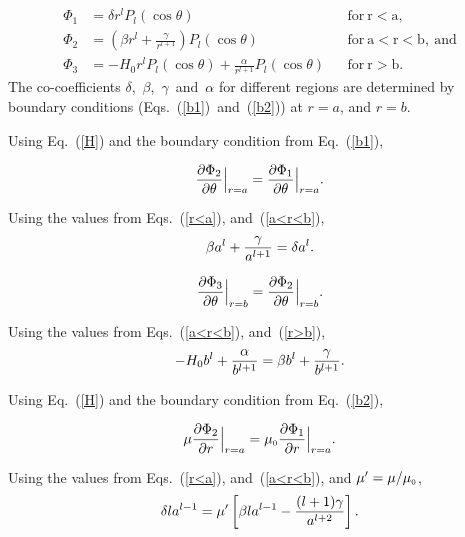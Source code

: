 \begin{align}
    \Phi_1 &= \delta r^l P_l(\cos\theta) && \mathrm{for~r<a,} \label{r<a} \\
    \Phi_2 &= \left(\beta r^l+\frac{\gamma}{r^{l+1}}\right)P_l(\cos\theta) && \mathrm{for~a<r<b,~and} \label{a<r<b} \\
    \Phi_3 &= -H_0 r^l P_l(\cos\theta)+\frac{\alpha}{r^{l+1}}P_l(\cos\theta) && \mathrm{for~r>b.} \label{r>b} 
\end{align}
The co-coefficients $\delta$,~$\beta$,~$\gamma$~and~$\alpha$ for different regions are determined by boundary conditions (Eqs.~(\ref{b1})~and~(\ref{b2})) at $r=a$, and $r=b$.

Using Eq.~(\ref{H}) and the boundary condition from Eq.~(\ref{b1}),


$$\frac{\partial \Phi_2}{\partial \theta}\Bigr|_{\substack{r=a}}=\frac{\partial \Phi_1}{\partial \theta}\Bigr|_{\substack{r=a}}{\rm .}$$

Using the values from Eqs.~(\ref{r<a}), and~(\ref{a<r<b}),
\begin{equation}\label{e01}
\beta a^l+\frac{\gamma}{a^{l+1}}=\delta a^l{\rm .}
\end{equation}

$$\frac{\partial \Phi_3}{\partial \theta}\Bigr|_{\substack{r=b}}=\frac{\partial \Phi_2}{\partial \theta}\Bigr|_{\substack{r=b}}{\rm .}$$

Using the values from Eqs.~(\ref{a<r<b}), and~(\ref{r>b}),
\begin{equation}\label{e02}
-H_0b^l+\frac{\alpha}{b^{l+1}}=\beta b^l+\frac{\gamma}{b^{l+1}}{\rm .}
\end{equation}



Using Eq.~(\ref{H}) and the boundary condition from Eq.~(\ref{b2}),

$$\mu \frac{\partial \Phi_2}{\partial r}\Bigr|_{\substack{r=a}}=\mu_{\scriptscriptstyle 0}\frac{\partial \Phi_1}{\partial r}\Bigr|_{\substack{r=a}}{\rm .}$$

Using the values from Eqs.~(\ref{r<a}), and~(\ref{a<r<b}), and  $\mu'=\mu/\mu_{\scriptscriptstyle 0}$,
\begin{equation}\label{e03}
\delta l a^{l-1}=\mu'\left[\beta l a^{l-1}-\frac{(l+1)\gamma}{a^{l+2}}\right]{\rm .}
\end{equation}


